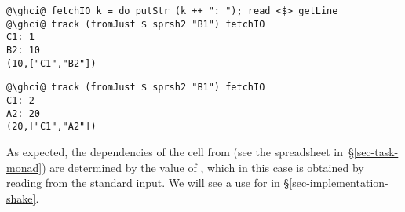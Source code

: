\vspace{1mm}
\begin{verbatim}
@\ghci@ fetchIO k = do putStr (k ++ ": "); read <$> getLine
@\ghci@ track (fromJust $ sprsh2 "B1") fetchIO
C1: 1
B2: 10
(10,["C1","B2"])
\end{verbatim}
\vspace{1mm}
\begin{verbatim}
@\ghci@ track (fromJust $ sprsh2 "B1") fetchIO
C1: 2
A2: 20
(20,["C1","A2"])
\end{verbatim}
\vspace{1mm}

\noindent
As expected, the dependencies of the cell  from  (see the
spreadsheet in~\S\ref{sec-task-monad}) are determined by the value of ,
which in this case is obtained by reading from the standard input.
We will see a use for  in \S\ref{sec-implementation-shake}.


%
%



